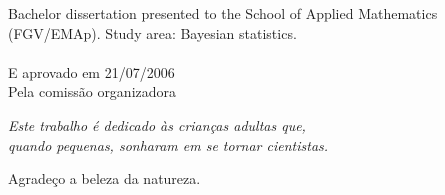 \documentclass[
	12pt,				%
	openright,			%
	twoside,			%
	a4paper,			%
	english,			%
	]{abntex2}
\renewcommand{\ABNTEXchapterfont}{\fontfamily{ptm}\fontseries{b}\selectfont}
\begin{document}
\begin{folhadeaprovacao}

  \begin{center}
    {\ABNTEXchapterfont\large\MakeUppercase{\imprimirautor}}

    \vspace*{\fill}\vspace*{\fill}
    \begin{center}
      \ABNTEXchapterfont\bfseries\large\MakeUppercase{\imprimirtitulo}	
    \end{center}
    \vspace*{\fill}
    
    \hspace{.1\textwidth}
    \begin{minipage}{.8\textwidth}
        Bachelor dissertation presented to the School of Applied Mathematics
        (FGV/EMAp). Study area: Bayesian statistics. \\ \\
		E aprovado em 21/07/2006 \\
		Pela comissão organizadora
    \end{minipage}%
    \vspace*{\fill}
   \end{center}

      

\end{folhadeaprovacao}

\begin{dedicatoria}
   \vspace*{\fill}
   \centering
   \noindent
   \textit{ Este trabalho é dedicado às crianças adultas que,\\
   quando pequenas, sonharam em se tornar cientistas.} \vspace*{\fill}
\end{dedicatoria}

\begin{agradecimentos}
	Agradeço a beleza da natureza.

\end{agradecimentos}
\end{document}
